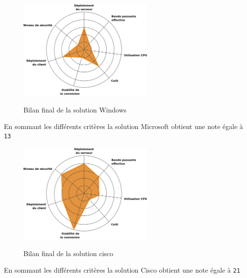 \begin{figure}[H]
	\begin{center}
		\includegraphics[width=0.6\textwidth]{partie_3/images/windows.png}\\
	\end{center}
	\caption{Bilan final de la solution Windows}
	\label{Graphe Windows}
\end{figure}

En sommant les différents critères la solution Microsoft obtient une note égale à \verb|13|

\begin{figure}[H]
	\begin{center}
		\includegraphics[width=0.6\textwidth]{partie_3/images/cisco.png}\\
	\end{center}
	\caption{Bilan final de la solution cisco}
	\label{Graphe cisco}
\end{figure}

En sommant les différents critères la solution Cisco obtient une note égale à \verb|21|

